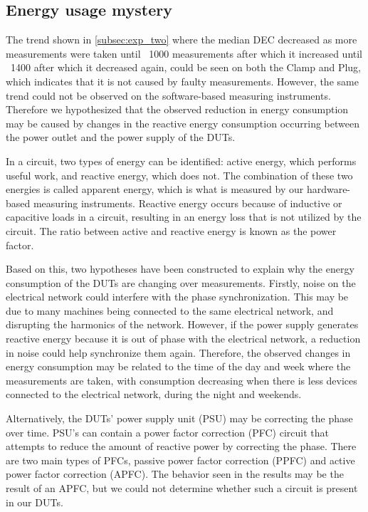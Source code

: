 \subsection{Energy usage mystery}

The trend shown in \cref{subsec:exp_two}  where the median DEC decreased as more measurements were taken until ~1000 measurements after which it increased until ~1400 after which it decreased again, could be seen on both the Clamp and Plug, which indicates that it is not caused by faulty measurements. However, the same trend could not be observed on the software-based measuring instruments. Therefore we hypothesized that the observed reduction in energy consumption may be caused by changes in the reactive energy consumption occurring between the power outlet and the power supply of the DUTs.

In a circuit, two types of energy can be identified: active energy, which performs useful work, and reactive energy, which does not. The combination of these two energies is called apparent energy, which is what is measured by our hardware-based measuring instruments. Reactive energy occurs because of inductive or capacitive loads in a circuit, resulting in an energy loss that is not utilized by the circuit\cite{ReactP}. The ratio between active and reactive energy is known as the power factor\cite{ReactP}.

Based on this, two hypotheses have been constructed to explain why the energy consumption of the DUTs are changing over measurements. Firstly, noise on the electrical network could interfere with the phase synchronization. This may be due to many machines being connected to the same electrical network, and disrupting the harmonics of the network\cite*{kullarkar2017power}. However, if the power supply generates reactive energy because it is out of phase with the electrical network, a reduction in noise could help synchronize them again. Therefore, the observed changes in energy consumption may be related to the time of the day and week where the measurements are taken, with consumption decreasing when there is less devices connected to the electrical network, during the night and weekends.

Alternatively, the DUTs' power supply unit (PSU) may be correcting the phase over time. PSU's can contain a power factor correction (PFC) circuit that attempts to reduce the amount of reactive power by correcting the phase. There are two main types of PFCs, passive power factor correction (PPFC) and active power factor correction (APFC)\cite{mcdonald2020power}. The behavior seen in the results may be the result of an APFC, but we could not determine whether such a circuit is present in our DUTs. %


